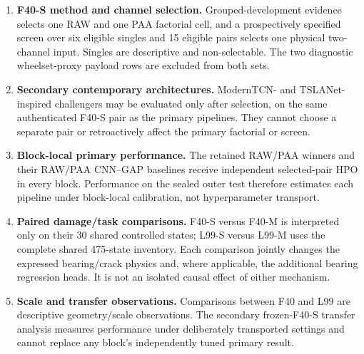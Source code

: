 \begin{enumerate}
  \item \textbf{F40-S method and channel selection.} Grouped-development
  evidence selects one RAW and one PAA factorial cell, and a prospectively
  specified screen over six eligible singles and 15 eligible pairs selects one
  physical two-channel input. Singles are descriptive and non-selectable.
  The two diagnostic wheelset-proxy payload rows are excluded from both sets.
  \item \textbf{Secondary contemporary architectures.} ModernTCN- and
  TSLANet-inspired challengers may be evaluated only after selection, on the
  same authenticated F40-S pair as the primary pipelines. They cannot choose a
  separate pair or retroactively affect the primary factorial or screen.
  \item \textbf{Block-local primary performance.} The retained RAW/PAA winners
  and their RAW/PAA CNN--GAP baselines receive independent selected-pair HPO in
  every block. Performance on the sealed outer test therefore estimates each
  pipeline under block-local calibration, not hyperparameter transport.
  \item \textbf{Paired damage/task comparisons.} F40-S versus F40-M is
  interpreted only on their 30 shared controlled states; L99-S versus L99-M
  uses the complete shared 475-state inventory. Each comparison jointly
  changes the expressed bearing/crack physics and, where applicable, the
  additional bearing regression heads. It is not an isolated causal effect of
  either mechanism.
  \item \textbf{Scale and transfer observations.} Comparisons between F40 and
  L99 are descriptive geometry/scale observations. The secondary frozen-F40-S
  transfer analysis measures performance under deliberately transported
  settings and cannot replace any block's independently tuned primary result.
\end{enumerate}

